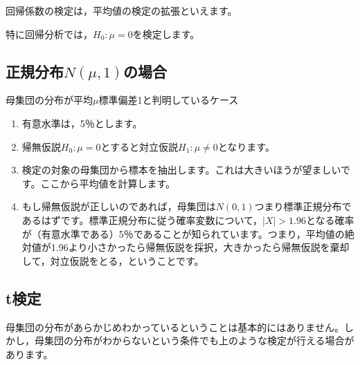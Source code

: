 \documentclass[
  letterpaper,
  DIV=11,
  numbers=noendperiod]{scrreprt}
\providecommand{\tightlist}{%
  \setlength{\itemsep}{0pt}\setlength{\parskip}{0pt}}\usepackage{longtable,booktabs,array}
\begin{document}
回帰係数の検定は，平均値の検定の拡張といえます。

特に回帰分析では，\(H_0 : \mu = 0\)を検定します。

\hypertarget{ux6b63ux898fux5206ux5e03nmu1ux306eux5834ux5408}{%
\subsection{\texorpdfstring{正規分布\(N(\mu,1)\)の場合}{正規分布N(\textbackslash mu,1)の場合}}\label{ux6b63ux898fux5206ux5e03nmu1ux306eux5834ux5408}}

母集団の分布が平均\(\mu\)標準偏差1と判明しているケース

\begin{enumerate}
\def\labelenumi{\arabic{enumi}.}
\tightlist
\item
  有意水準は，5％とします。
\item
  帰無仮説\(H_0 : \mu = 0\)とすると対立仮説\(H_1 : \mu \ne 0\)となります。
\item
  検定の対象の母集団から標本を抽出します。これは大きいほうが望ましいです。ここから平均値を計算します。
\item
  もし帰無仮説が正しいのであれば，母集団は\(N(0,1)\)つまり標準正規分布であるはずです。標準正規分布に従う確率変数について，\(|X|>1.96\)となる確率が（有意水準である）5％であることが知られています。つまり，平均値の絶対値が1.96より小さかったら帰無仮説を採択，大きかったら帰無仮説を棄却して，対立仮説をとる，ということです。
\end{enumerate}

\hypertarget{tux691cux5b9a}{%
\subsection{t検定}\label{tux691cux5b9a}}

母集団の分布があらかじめわかっているということは基本的にはありません。しかし，母集団の分布がわからないという条件でも上のような検定が行える場合があります。
\end{document}
